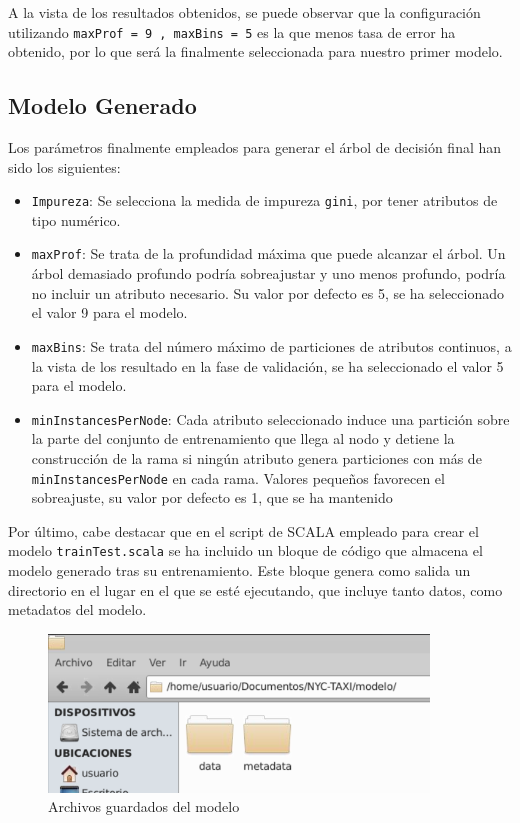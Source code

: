 \documentclass[12pt]{article}
\begin{document}
A la vista de los resultados obtenidos, se puede observar que la configuración utilizando \texttt{maxProf = 9 , maxBins = 5} es la que menos tasa de error ha obtenido, por lo que será la finalmente seleccionada para nuestro primer modelo.

\subsection{Modelo Generado}\label{cap5.2}
Los parámetros finalmente empleados para generar el árbol de decisión final han sido los siguientes:

\begin{itemize}
    \item \texttt{Impureza}: Se selecciona la medida de impureza \texttt{gini}, por tener atributos de tipo numérico.
    \item \texttt{maxProf}: Se trata de la profundidad máxima que puede alcanzar el árbol. Un árbol demasiado profundo podría sobreajustar y uno menos profundo, podría no incluir un atributo necesario. Su valor por defecto es 5, se ha seleccionado el valor 9 para el modelo.
    \item \texttt{maxBins}: Se trata del número máximo de particiones de atributos continuos, a la vista de los resultado en la fase de validación, se ha seleccionado el valor 5 para el modelo.
    \item \texttt{minInstancesPerNode}: Cada atributo seleccionado induce una partición sobre la parte del 
    conjunto de entrenamiento que llega al nodo y detiene la construcción de la rama si ningún atributo genera particiones con más de \texttt{minInstancesPerNode} en cada rama. Valores pequeños favorecen el sobreajuste, su valor por defecto es 1, que se ha mantenido
\end{itemize}

Por último, cabe destacar que en el script de SCALA empleado para crear el modelo \texttt{trainTest.scala} se ha incluido un bloque de código que almacena el modelo generado tras su entrenamiento. Este bloque genera como salida un directorio en el lugar en el que se esté ejecutando, que incluye tanto datos, como metadatos del modelo.

\begin{figure}[H]
    \centering
    \includegraphics[width=0.9\textwidth]{guardado.png}
    \caption{Archivos guardados del modelo}
    \label{fig:guardado}
\end{figure}
\end{document}
